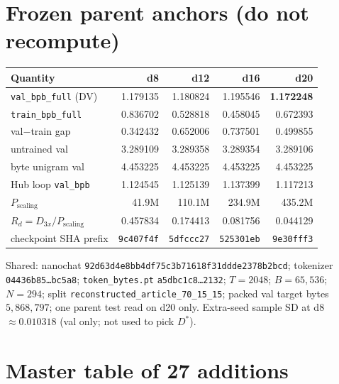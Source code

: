 \documentclass[11pt,a4paper]{article}
\begin{document}
\section{Frozen parent anchors (do not recompute)}
\label{sec:anchors}

\begin{center}
\small
\begin{tabular}{lrrrr}
\toprule
Quantity & d8 & d12 & d16 & d20 \\
\midrule
\texttt{val\_bpb\_full} (DV) & 1.179135 & 1.180824 & 1.195546 & \textbf{1.172248} \\
\texttt{train\_bpb\_full} & 0.836702 & 0.528818 & 0.458045 & 0.672393 \\
val$-$train gap & 0.342432 & 0.652006 & 0.737501 & 0.499855 \\
untrained val & 3.289109 & 3.289358 & 3.289354 & 3.289106 \\
byte unigram val & 4.453225 & 4.453225 & 4.453225 & 4.453225 \\
Hub loop \texttt{val\_bpb} & 1.124545 & 1.125139 & 1.137399 & 1.117213 \\
$P_{\mathrm{scaling}}$ & 41.9M & 110.1M & 234.9M & 435.2M \\
$R_d=D_{3x}/P_{\mathrm{scaling}}$ & 0.457834 & 0.174413 & 0.081756 & 0.044129 \\
checkpoint SHA prefix & \texttt{9c407f4f} & \texttt{5dfccc27} & \texttt{525301eb} & \texttt{9e30fff3} \\
\bottomrule
\end{tabular}
\end{center}

Shared: nanochat \texttt{92d63d4e8bb4df75c3b71618f31ddde2378b2bcd}; tokenizer \texttt{04436b85\ldots bc5a8}; \texttt{token\_bytes.pt} \texttt{a5dbc1c8\ldots 2132}; $T=2048$; $B=65{,}536$; $N=294$; split \texttt{reconstructed\_article\_70\_15\_15}; packed val target bytes $5{,}868{,}797$; one parent test read on d20 only. Extra-seed sample SD at d8 $\approx 0.010318$ (val only; not used to pick $D^{\ast}$).

\section{Master table of 27 additions}
\label{sec:master}
\end{document}

